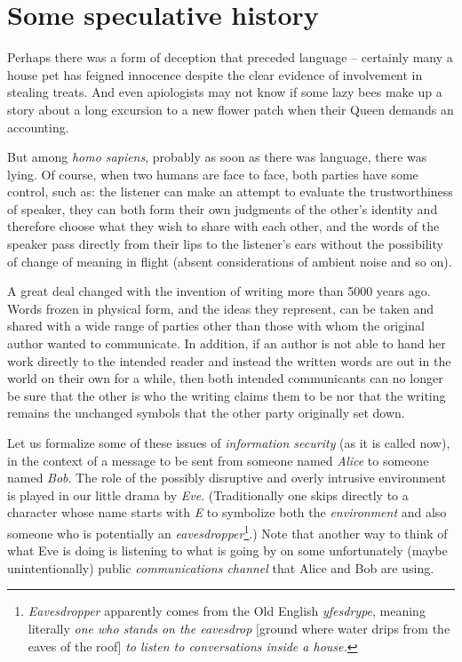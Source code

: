 \documentclass[12pt,letterpaper]{amsbook}
\theoremstyle{definition}
\theoremstyle{remark}
\numberwithin{figure}{section}
\numberwithin{exercise}{chapter}
\numberwithin{section}{chapter}
\numberwithin{equation}{section}
\numberwithin{table}{subsection}
\newcommand{\ix}[1]{{#1}\index{#1}}
\begin{document}
\vfill
\pagebreak
\section{Some speculative history}
\label{sec:Ssh}

Perhaps there was a form of deception that preceded language -- certainly many
a house pet has feigned innocence despite the clear evidence of involvement in
stealing treats.  And even apiologists may not know if some lazy bees make up
a story about a long excursion to a new flower patch when their Queen demands
an accounting.

But among {\it homo sapiens}, probably as soon as there was language, there
was lying.  Of course, when two humans are face to face, both parties have
some control, such as: the listener can make an attempt to evaluate the
trustworthiness of speaker, they can both form their own judgments of the
other's identity and therefore choose what they wish to share with each
other, and the words of the speaker pass directly from their lips to the
listener's ears without the possibility of change of meaning in flight
(absent considerations of ambient noise and so on).

A great deal changed with the invention of writing more than 5000 years ago.
Words frozen in physical form, and the ideas they represent, can be taken and
shared with a wide range of parties other than those with whom the original
author wanted to communicate.  In addition, if an author is not able to hand
her work directly to the intended reader and instead the written words are
out in the world on their own for a while, then both intended communicants can
no longer be sure that the other is who the writing claims them to be nor
that the writing remains the unchanged symbols that the other party originally
set down.

Let us formalize some of these issues of {\it\ix{information security}} (as
it is called now), in the context of a message to be sent from someone named
{\it Alice} to someone named {\it Bob}.  The role of the possibly disruptive
and overly intrusive environment is played in our little drama by {\it Eve}.
(Traditionally one skips directly to a character whose name starts with {\it
E} to symbolize both the {\it environment} and also someone who is
potentially an {\it eavesdropper}\footnote{{\it Eavesdropper} apparently comes
from the Old English {\it\ix{yfesdrype}}, meaning literally {\it one who stands
on the eavesdrop} [ground where water drips from the eaves of the roof]
{\it to listen to conversations inside a house.}}.)  Note that another way to
think of what Eve is doing is listening to what is going by on some
unfortunately (maybe unintentionally) public \textit{communications channel}
that Alice and Bob are using.
\end{document}
